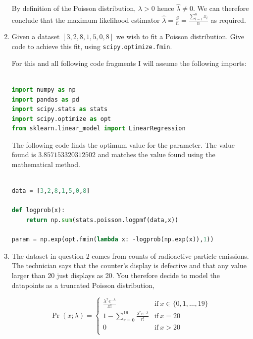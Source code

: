 \documentclass[10pt,\jkfside,a4paper]{article}
\begin{document}
\begin{enumerate}
By definition of the Poisson distribution, $\lambda > 0$ hence
$\hat{\lambda} \neq 0$. We can therefore conclude that the maximum
likelihood estimator $\hat{\lambda} = \frac{S}{n} = \frac{\sum^n_{i=1}x_i}{n}$
as required.

\item Given a dataset $[3, 2, 8, 1, 5, 0, 8]$ we wish to fit a Poisson
distribution. Give code to achieve this fit, using \texttt{scipy.optimize.fmin}.

For this and all following code fragments I will assume the following imports:

\begin{lstlisting}[language=Python]

import numpy as np
import pandas as pd
import scipy.stats as stats
import scipy.optimize as opt
from sklearn.linear_model import LinearRegression

\end{lstlisting}

The following code finds the optimum value for the parameter. The value
found is $3.857153320312502$ and matches the value found using the
mathematical method.

\begin{lstlisting}[language=Python]

data = [3,2,8,1,5,0,8]

def logprob(x):
	return np.sum(stats.poisson.logpmf(data,x))

param = np.exp(opt.fmin(lambda x: -logprob(np.exp(x)),1))

\end{lstlisting}

\item The dataset in question 2 comes from counts of radioactive particle
emissions. The technician says that the counter's display is defective and
that any value larger than 20 just displays as 20. You therefore decide to
model the datapoints as a truncated Poisson distribution,

\[
\Pr(x; \lambda) =
\begin{cases}
\frac{\lambda^x e^{-\lambda}}{x!} & \text{if} \ x \in \{0, 1, \dots, 19\} \\
1 - \sum^{19}_{r=0}\frac{\lambda^r e^{-\lambda}}{r!} & \text{if} \ x = 20 \\
0 & \text{if} \ x > 20 \\
\end{cases}
\]

\begin{enumerate}


\end{enumerate}
\end{enumerate}
\end{document}
